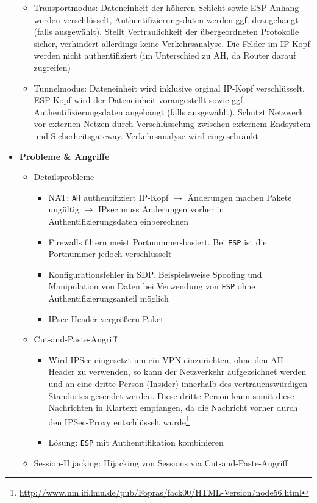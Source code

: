 \begin{itemize}
\begin{itemize}
		\item Transportmodus: Dateneinheit der höheren Schicht sowie ESP-Anhang werden verschlüsselt, Authentifizierungsdaten werden ggf. drangehängt (falls ausgewählt). Stellt Vertraulichkeit der übergeordneten Protokolle sicher, verhindert allerdings keine Verkehrsanalyse. Die Felder im IP-Kopf werden nicht authentifiziert (im Unterschied zu AH, da Router darauf zugreifen)
		\item Tunnelmodus: Dateneinheit wird inklusive orginal IP-Kopf verschlüsselt, ESP-Kopf wird der Dateneinheit vorangestellt sowie ggf. Authentifizierungsdaten angehängt (falls ausgewählt). Schützt Netzwerk vor externen Netzen durch Verschlüsselung zwischen externem Endsystem und Sicherheitsgateway. Verkehrsanalyse wird eingeschränkt
	\end{itemize}
	\item \textbf{Probleme \& Angriffe}
	\begin{itemize}
		\item Detailsprobleme
		\begin{itemize}
			\item NAT: \texttt{AH} authentifiziert IP-Kopf \(\rightarrow\) Änderungen machen Pakete ungültig \(\rightarrow\) IPsec muss Änderungen vorher in Authentifizierungsdaten einberechnen
			\item Firewalls filtern meist Portnummer-basiert. Bei \texttt{ESP} ist die Portnummer jedoch verschlüsselt
			\item Konfigurationsfehler in SDP. Beispielsweise Spoofing und Manipulation von Daten bei Verwendung von \texttt{ESP} ohne Authentifizierungsanteil möglich
			\item IPsec-Header vergrößern Paket
		\end{itemize}
		\item Cut-and-Paste-Angriff
		\begin{itemize}
			\item Wird IPSec eingesetzt um ein VPN einzurichten, ohne den AH-Header zu verwenden, so kann der Netzverkehr aufgezeichnet werden und an eine dritte Person (Insider) innerhalb des vertrauenswürdigen Standortes gesendet werden. Diese dritte Person kann somit diese Nachrichten in Klartext empfangen, da die Nachricht vorher durch den IPSec-Proxy entschlüsselt wurde\footnote{\url{http://www.nm.ifi.lmu.de/pub/Fopras/fack00/HTML-Version/node56.html}}
			\item Lösung: \texttt{ESP} mit Authemtifikation kombinieren
		\end{itemize}
		\item Session-Hijacking: Hijacking von Sessions via Cut-and-Paste-Angriff
	\end{itemize}
\end{itemize}


